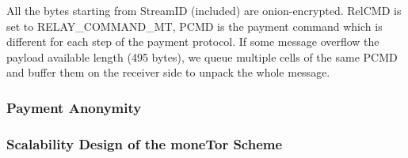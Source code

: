 All the bytes starting from StreamID (included) are onion-encrypted. RelCMD is set to RELAY\_COMMAND\_MT, PCMD is the payment command which is different for each step of the payment protocol. If some message overflow the payload available length (495 bytes), we queue multiple cells of the same PCMD and buffer them on the receiver side to unpack the whole message.

\subsubsection{Payment Anonymity}



\subsubsection{Scalability Design of the moneTor Scheme}
\label{subsub:scalability}
